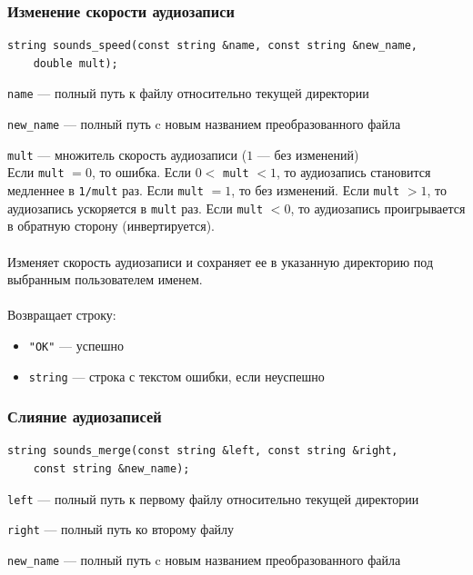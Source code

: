 \documentclass[14pt,a4paper]{article}
\begin{document}
\subsubsection*{Изменение скорости аудиозаписи}

\begin{lstlisting}
string sounds_speed(const string &name, const string &new_name, 
	double mult);
\end{lstlisting}

\lstinline{name} --- полный путь к файлу относительно текущей директории \par
\lstinline{new_name} --- полный путь c новым названием преобразованного файла \par
\lstinline{mult} --- множитель скорость аудиозаписи ($1$ --- без изменений) \\

\noindent Если \lstinline{mult} $= 0$, то ошибка. Если $0 <$ \lstinline{mult} $< 1$, то аудиозапись становится медленнее в \lstinline{1/mult} раз. Если \lstinline{mult} $= 1$, то без изменений. Если \lstinline{mult} $> 1$, то аудиозапись ускоряется в \lstinline{mult} раз. Если \lstinline{mult} $< 0$, то аудиозапись проигрывается в обратную сторону (инвертируется).\\\\
Изменяет скорость аудиозаписи и сохраняет ее в указанную директорию под выбранным пользователем именем. \\\\
Возвращает строку:
\smallskip
\begin{itemize}
\item \lstinline{"OK"} --- успешно
\item \lstinline{string} --- строка с текстом ошибки, если неуспешно
\end{itemize}

\subsubsection*{Слияние аудиозаписей}

\begin{lstlisting}
string sounds_merge(const string &left, const string &right, 
	const string &new_name);
\end{lstlisting}

\lstinline{left} --- полный путь к первому файлу относительно текущей директории \par
\lstinline{right} --- полный путь ко второму файлу \par
\lstinline{new_name} --- полный путь c новым названием преобразованного файла \\
\end{document}
